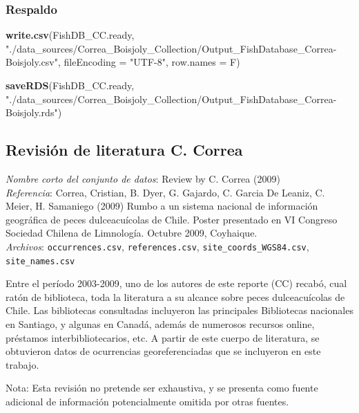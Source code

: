 \documentclass[sn-apa,pdflatex]{sn-jnl}
\newenvironment{Shaded}{\begin{snugshade}}{\end{snugshade}}
\newcommand{\AttributeTok}[1]{\textcolor[rgb]{0.13,0.29,0.53}{#1}}
\newcommand{\FunctionTok}[1]{\textcolor[rgb]{0.13,0.29,0.53}{\textbf{#1}}}
\newcommand{\NormalTok}[1]{#1}
\newcommand{\StringTok}[1]{\textcolor[rgb]{0.31,0.60,0.02}{#1}}
\begin{document}
\subsubsection{Respaldo}\label{respaldo}

\begin{Shaded}
\begin{Highlighting}[]
\FunctionTok{write.csv}\NormalTok{(FishDB\_CC.ready, }\StringTok{"./data\_sources/Correa\_Boisjoly\_Collection/Output\_FishDatabase\_Correa{-}Boisjoly.csv"}\NormalTok{,}
    \AttributeTok{fileEncoding =} \StringTok{"UTF{-}8"}\NormalTok{, }\AttributeTok{row.names =}\NormalTok{ F)}

\FunctionTok{saveRDS}\NormalTok{(FishDB\_CC.ready, }\StringTok{"./data\_sources/Correa\_Boisjoly\_Collection/Output\_FishDatabase\_Correa{-}Boisjoly.rds"}\NormalTok{)}
\end{Highlighting}
\end{Shaded}

\subsection{Revisión de literatura C.
Correa}\label{revisiuxf3n-de-literatura-c.-correa}

\emph{Nombre corto del conjunto de datos}: Review by C. Correa (2009)\\
\emph{Referencia}: Correa, Cristian, B. Dyer, G. Gajardo, C. Garcia De
Leaniz, C. Meier, H. Samaniego (2009) Rumbo a un sistema nacional de
información geográfica de peces dulceacuícolas de Chile. Poster
presentado en VI Congreso Sociedad Chilena de Limnología. Octubre 2009,
Coyhaique. \citep{Correa2009}\\
\emph{Archivos}: \texttt{occurrences.csv}, \texttt{references.csv},
\texttt{site\_coords\_WGS84.csv}, \texttt{site\_names.csv}

Entre el período 2003-2009, uno de los autores de este reporte (CC)
recabó, cual ratón de biblioteca, toda la literatura a su alcance sobre
peces dulceacuícolas de Chile. Las bibliotecas consultadas incluyeron
las principales Bibliotecas nacionales en Santiago, y algunas en Canadá,
además de numerosos recursos online, préstamos interbibliotecarios, etc.
A partir de este cuerpo de literatura, se obtuvieron datos de
ocurrencias georeferenciadas que se incluyeron en este trabajo.

Nota: Esta revisión no pretende ser exhaustiva, y se presenta como
fuente adicional de información potencialmente omitida por otras
fuentes.
\end{document}
